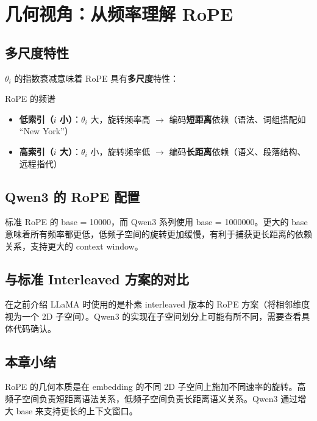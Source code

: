 \section{几何视角：从频率理解 RoPE}

\subsection{多尺度特性}

$\theta_i$ 的指数衰减意味着 RoPE 具有\textbf{多尺度}特性：

\begin{importantbox}{RoPE 的频谱}
\begin{itemize}
  \item \textbf{低索引（$i$ 小）}：$\theta_i$ 大，旋转频率高 $\to$ 编码\textbf{短距离}依赖（语法、词组搭配如 ``New York''）
  \item \textbf{高索引（$i$ 大）}：$\theta_i$ 小，旋转频率低 $\to$ 编码\textbf{长距离}依赖（语义、段落结构、远程指代）
\end{itemize}
\end{importantbox}

\subsection{Qwen3 的 RoPE 配置}

标准 RoPE 的 base = 10000，而 Qwen3 系列使用 base = 1000000。更大的 base 意味着所有频率都更低，低频子空间的旋转更加缓慢，有利于捕获更长距离的依赖关系，支持更大的 context window。

\subsection{与标准 Interleaved 方案的对比}

在之前介绍 LLaMA 时使用的是朴素 interleaved 版本的 RoPE 方案（将相邻维度视为一个 2D 子空间）。Qwen3 的实现在子空间划分上可能有所不同，需要查看具体代码确认。

\subsection{本章小结}

RoPE 的几何本质是在 embedding 的不同 2D 子空间上施加不同速率的旋转。高频子空间负责短距离语法关系，低频子空间负责长距离语义关系。Qwen3 通过增大 base 来支持更长的上下文窗口。

